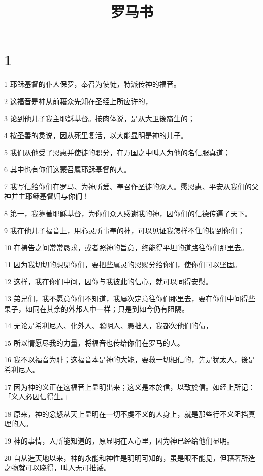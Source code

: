 

\title{罗马书}


\chapter{1}

\par 1 耶稣基督的仆人保罗，奉召为使徒，特派传神的福音。
\par 2 这福音是神从前藉众先知在圣经上所应许的，
\par 3 论到他儿子我主耶稣基督。按肉体说，是从大卫後裔生的；
\par 4 按圣善的灵说，因从死里复活，以大能显明是神的儿子。
\par 5 我们从他受了恩惠并使徒的职分，在万国之中叫人为他的名信服真道；
\par 6 其中也有你们这蒙召属耶稣基督的人。
\par 7 我写信给你们在罗马、为神所爱、奉召作圣徒的众人。愿恩惠、平安从我们的父神并主耶稣基督归与你们！
\par 8 第一，我靠著耶稣基督，为你们众人感谢我的神，因你们的信德传遍了天下。
\par 9 我在他儿子福音上，用心灵所事奉的神，可以见证我怎样不住的提到你们；
\par 10 在祷告之间常常恳求，或者照神的旨意，终能得平坦的道路往你们那里去。
\par 11 因为我切切的想见你们，要把些属灵的恩赐分给你们，使你们可以坚固。
\par 12 这样，我在你们中间，因你与我彼此的信心，就可以同得安慰。
\par 13 弟兄们，我不愿意你们不知道，我屡次定意往你们那里去，要在你们中间得些果子，如同在其余的外邦人中一样；只是到如今仍有阻隔。
\par 14 无论是希利尼人、化外人、聪明人、愚拙人，我都欠他们的债，
\par 15 所以情愿尽我的力量，将福音也传给你们在罗马的人。
\par 16 我不以福音为耻；这福音本是神的大能，要救一切相信的，先是犹太人，後是希利尼人。
\par 17 因为神的义正在这福音上显明出来；这义是本於信，以致於信。如经上所记：「义人必因信得生。」
\par 18 原来，神的忿怒从天上显明在一切不虔不义的人身上，就是那些行不义阻挡真理的人。
\par 19 神的事情，人所能知道的，原显明在人心里，因为神已经给他们显明。
\par 20 自从造天地以来，神的永能和神性是明明可知的，虽是眼不能见，但藉著所造之物就可以晓得，叫人无可推诿。
